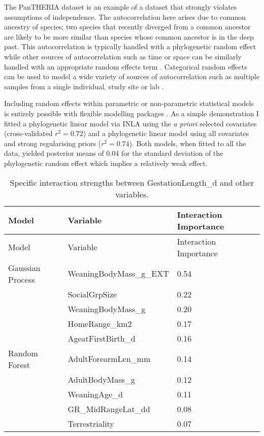 \documentclass[10pt,]{article}
\begin{document}
The PanTHERIA dataset is an example of a dataset that strongly violates assumptions of independence.
The autocorrelation here arises due to common ancestry of species; two species that recently diverged from a common ancestor are likely to be more similar than species whose common ancestor is in the deep past.
This autocorrelation is typically handled with a phylogenetic random effect \citep{felsenstein1985phylogenies, ives2006statistics, gay2014parasite, pellissier2012shifts, ferguson2014colony} while other sources of autocorrelation such as time or space can be similarly handled with an appropriate random effects term \citep{ives2006statistics, redding2017evaluating, diggle1998model}.
Categorical random effects can be used to model a wide variety of sources of autocorrelation such as multiple samples from a single individual, study site or lab  \citep{harrison2018brief, bolker2009generalized}.

Including random effects within parametric or non-parametric statistical models is entirely possible with flexible modelling packages \citep{stan, INLA, glmmTMB, tmb}.
As a simple demonstration I fitted a phylogenetic linear model via INLA \citep{INLA} using the \emph{a priori} selected covariates (cross-validated \(r^2 = 0.72\)) and a phylogenetic linear model using all covariates and strong regularising priors (\(r^2 = 0.74\)).
Both models, when fitted to all the data, yielded posterior means of 0.04 for the standard deviation of the phylogenetic random effect which implies a relatively weak effect.

\begin{table}[t!]
\begin{longtable}[c]{@{}lll@{}}
\caption{Specific interaction strengths between GestationLength\_d and other variables. \label{tbl:specificinter}}\tabularnewline
\toprule
Model & Variable & Interaction Importance\tabularnewline
\midrule
\endfirsthead
\toprule
Model & Variable & Interaction Importance\tabularnewline
\midrule
\endhead
Gaussian Process & WeaningBodyMass\_g\_EXT & 0.54\tabularnewline
& SocialGrpSize & 0.22\tabularnewline
& WeaningBodyMass\_g & 0.20\tabularnewline
& HomeRange\_km2 & 0.17\tabularnewline
& AgeatFirstBirth\_d & 0.16\tabularnewline
Random Forest & AdultForearmLen\_mm & 0.14\tabularnewline
& AdultBodyMass\_g & 0.12\tabularnewline
& WeaningAge\_d & 0.11\tabularnewline
& GR\_MidRangeLat\_dd & 0.08\tabularnewline
& Terrestriality & 0.07\tabularnewline
\bottomrule
\end{longtable}
\end{table}
\end{document}
